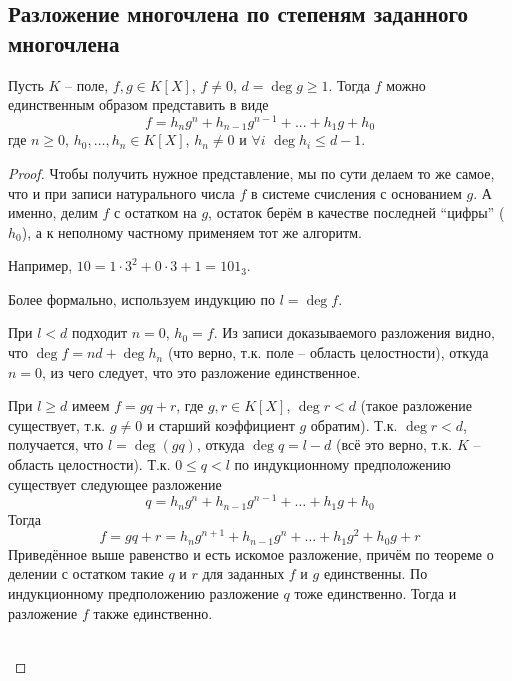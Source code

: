 
\begin{normalsize}
\section{Разложение многочлена по степеням заданного многочлена}

\begin{theorem-non}
    Пусть $K$ -- поле, $f, g \in K[X]$, $f \neq 0$,
    $d = \deg g \geqslant 1$. Тогда $f$ можно единственным
    образом представить в виде
    \[f = h_n g^n + h_{n-1}g^{n-1} + ... + h_1 g + h_0\]
    где $n \geqslant 0$, $h_0, \dots, h_n \in K[X]$,
    $h_n \neq 0$ и $\forall i \,\, \deg h_i \leqslant 
    d - 1$.
\end{theorem-non}
\begin{proof}
    Чтобы получить нужное представление, мы по сути делаем то же
    самое, что и при записи натурального числа $f$ в системе счисления
    с основанием $g$. А именно, делим $f$ с остатком на $g$, остаток 
    берём в качестве последней ``цифры'' ($h_0$), а к неполному частному
    применяем тот же алгоритм.

    Например, $10 = 1 \cdot 3^2 + 0 \cdot 3 + 1 = 101_3$.

    Более формально, используем индукцию по $l = \deg f$.

    При $l < d$ подходит $n = 0$, $h_0 = f$. Из записи доказываемого
    разложения видно, что $\deg f = nd + \deg h_n$ (что верно, т.к.
    поле -- область целостности), откуда $n = 0$, из чего следует, что
    это разложение единственное.

    При $l \geqslant d$ имеем $f = gq + r$, где $g, r \in K[X]$,
    $\deg r < d$ (такое разложение существует, т.к. $g \neq 0$ и
    старший коэффициент $g$ обратим). Т.к. $\deg r < d$, получается,
    что $l = \deg(gq)$, откуда $\deg q = l - d$ (всё это верно, т.к.
    $K$ -- область целостности). Т.к. $0 \leqslant q < l$ по 
    индукционному предположению существует следующее разложение
    \[q = h_n g^n + h_{n-1} g^{n-1} + \dots + h_1 g + h_0\]
    Тогда
    \[f = gq + r = h_n g^{n+1} + h_{n-1} g^n + \dots + h_1 g^2 + 
    h_0 g + r\]
    Приведённое выше равенство и есть искомое разложение, причём
    по теореме о делении с остатком такие $q$ и $r$ для заданных
    $f$ и $g$ единственны. По индукционному предположению разложение
    $q$ тоже единственно. Тогда и разложение $f$ также единственно.

    \\
     \par

\end{proof}

\end{normalsize}